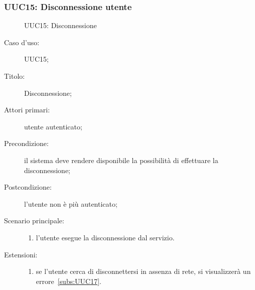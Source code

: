 \documentclass[../../../analisi-dei-requisiti.tex]{subfiles}
\begin{document}
\subsubsection{UUC15: Disconnessione utente}%
\label{subs:UU15}

\begin{figure}[H]
  \centering
  \caption{UUC15: Disconnessione}%
  \label{fig:UUC15}
\end{figure}

\begin{description}
  \item[Caso d’uso:] UUC15;
  \item[Titolo:] Disconnessione;
  \item[Attori primari:] utente autenticato;
  \item[Precondizione:] il sistema deve rendere disponibile la possibilità di effettuare la disconnessione;
  \item[Postcondizione:] l'utente non è più autenticato;
  \item[Scenario principale:]
        \begin{enumerate}
          \item l'utente esegue la disconnessione dal servizio.
        \end{enumerate}
  \item[Estensioni:]
        \begin{enumerate}
          \item se l'utente cerca di disconnettersi in assenza di rete, si visualizzerà un errore~\ref{subs:UUC17}.
        \end{enumerate}
\end{description}
\end{document}
